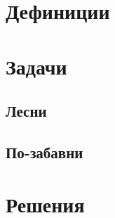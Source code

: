 \documentclass[12pt]{article}
\begin{document}
\section*{Дефиниции}

\section*{Задачи}

\subsection*{Лесни}

\subsection*{По-забавни}

\section*{Решения}
\end{document}
